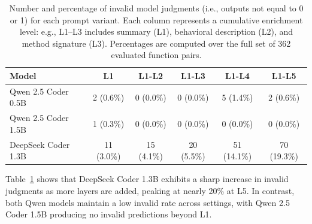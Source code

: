 \documentclass[a4paper]{usiinfbachelorproject}
\begin{document}
\begin{table}[htbp]
\centering
\caption{Number and percentage of invalid model judgments (i.e., outputs not equal to 0 or 1) for each prompt variant. Each column represents a cumulative enrichment level: e.g., L1–L3 includes summary (L1), behavioral description (L2), and method signature (L3). Percentages are computed over the full set of 362 evaluated function pairs.}
\begin{tabular}{lccccc}
\toprule
\textbf{Model} & \textbf{L1} & \textbf{L1-L2} & \textbf{L1-L3} & \textbf{L1-L4} & \textbf{L1-L5} \\
\midrule
Qwen 2.5 Coder 0.5B & 2 (0.6\%) & 0 (0.0\%) & 0 (0.0\%) & 5 (1.4\%) & 2 (0.6\%) \\
Qwen 2.5 Coder 1.5B & 1 (0.3\%) & 0 (0.0\%) & 0 (0.0\%) & 0 (0.0\%) & 0 (0.0\%) \\
DeepSeek Coder 1.3B & 11 (3.0\%) & 15 (4.1\%) & 20 (5.5\%) & 51 (14.1\%) & 70 (19.3\%) \\
\bottomrule
\end{tabular}
\label{tab:invalid-judgments}
\end{table}

\noindent
Table~\ref{tab:invalid-judgments} shows that DeepSeek Coder 1.3B exhibits a sharp increase in invalid judgments as more layers are added, peaking at nearly 20\% at L5. In contrast, both Qwen models maintain a low invalid rate across settings, with Qwen 2.5 Coder 1.5B producing no invalid predictions beyond L1. 
\end{document}
